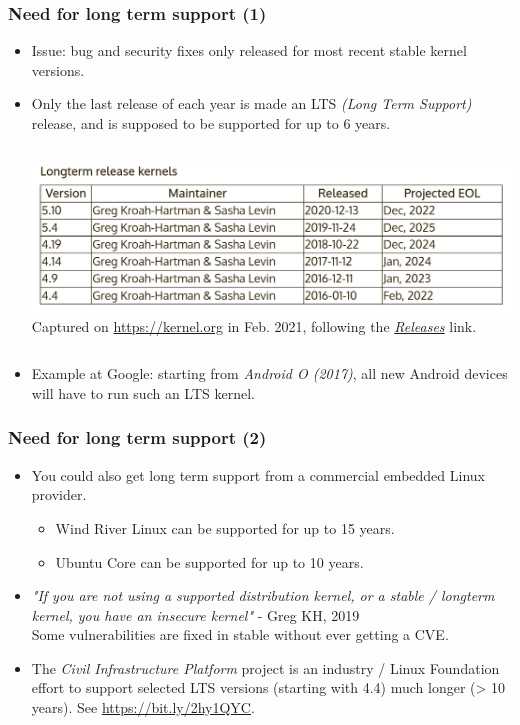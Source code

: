 \begin{frame}[fragile]
  \frametitle{Need for long term support (1)}
  \begin{itemize}
  \item Issue: bug and security fixes only released for most recent
    stable kernel versions.
  \item Only the last release of each year is made an  LTS {\em (Long Term
     Support)} release, and is supposed to be supported for up to 6 years.
  \begin{columns}
  \includegraphics[width=\textwidth]{slides/sysdev-linux-intro-versioning/longterm-release-kernels.png}\\
  \scriptsize
   Captured on \url{https://kernel.org} in Feb. 2021, following the
   \href{https://www.kernel.org/category/releases.html}{\em Releases} link.
  \end{columns}
  \item Example at Google: starting from {\em Android O (2017)}, all new Android devices will
    have to run such an LTS kernel.
  \end{itemize}
\end{frame}

\begin{frame}[fragile]
  \frametitle{Need for long term support (2)}
  \begin{itemize}
  \item You could also get long term support from a commercial embedded
    Linux provider.
    \begin{itemize}
	\item Wind River Linux can be supported for up to 15 years.
	\item Ubuntu Core can be supported for up to 10 years.
    \end{itemize}
  \item {\em "If you are not using a supported distribution kernel, or a stable / longterm
    kernel, you have an insecure kernel"} - Greg KH, 2019\\
    Some vulnerabilities are fixed in stable without ever getting a CVE.
  \item The {\em Civil Infrastructure Platform} project is an industry /
    Linux Foundation effort to support selected LTS versions (starting
    with 4.4) much longer (> 10 years). See \url{https://bit.ly/2hy1QYC}.
  \end{itemize}
\end{frame}

